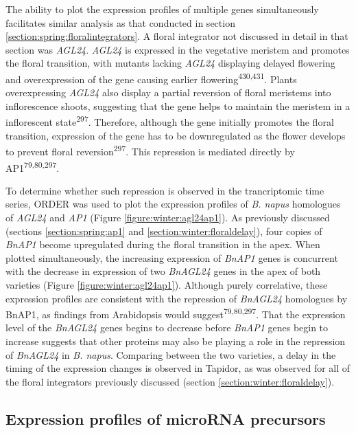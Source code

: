 \documentclass[12pt,]{book}
\begin{document}
The ability to plot the expression profiles of multiple genes
simultaneously facilitates similar analysis as that conducted in section
\ref{section:spring:floralintegrators}. A floral integrator not
discussed in detail in that section was \emph{AGL24}. \emph{AGL24} is
expressed in the vegetative meristem and promotes the floral transition,
with mutants lacking \emph{AGL24} displaying delayed flowering and
overexpression of the gene causing earlier
flowering\textsuperscript{430,431}. Plants overexpressing \emph{AGL24}
also display a partial reversion of floral meristems into inflorescence
shoots, suggesting that the gene helps to maintain the meristem in a
inflorescent state\textsuperscript{297}. Therefore, although the gene
initially promotes the floral transition, expression of the gene has to
be downregulated as the flower develops to prevent floral
reversion\textsuperscript{297}. This repression is mediated directly by
AP1\textsuperscript{79,80,297}.

To determine whether such repression is observed in the trancriptomic
time series, ORDER was used to plot the expression profiles of \emph{B.
napus} homologues of \emph{AGL24} and \emph{AP1} (Figure
\ref{figure:winter:agl24ap1}). As previously discussed (sections
\ref{section:spring:ap1} and \ref{section:winter:floraldelay}), four
copies of \emph{BnAP1} become upregulated during the floral transition
in the apex. When plotted simultaneously, the increasing expression of
\emph{BnAP1} genes is concurrent with the decrease in expression of two
\emph{BnAGL24} genes in the apex of both varieties (Figure
\ref{figure:winter:agl24ap1}). Although purely correlative, these
expression profiles are consistent with the repression of \emph{BnAGL24}
homologues by BnAP1, as findings from Arabidopsis would
suggest\textsuperscript{79,80,297}. That the expression level of the
\emph{BnAGL24} genes begins to decrease before \emph{BnAP1} genes begin
to increase suggests that other proteins may also be playing a role in
the repression of \emph{BnAGL24} in \emph{B. napus}. Comparing between
the two varieties, a delay in the timing of the expression changes is
observed in Tapidor, as was observed for all of the floral integrators
previously discussed (section \ref{section:winter:floraldelay}).

\subsection{Expression profiles of microRNA
precursors}\label{expression-profiles-of-microrna-precursors}
\end{document}
